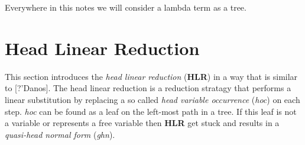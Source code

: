 \documentclass[a4paper, 10pt]{article}
\begin{document}
Everywhere in this notes we will consider a lambda term as a tree.

\section{Head Linear Reduction}

This section introduces the \emph{head linear reduction} (\textbf{HLR}) in a way that
is similar to [?'Danos].
The head linear reduction is a reduction stratagy that performs a linear substitution
by replacing a so called \emph{head variable occurrence} (\emph{hoc}) on each step.
\emph{hoc} can be found as a leaf on the left-most path in a tree. If this leaf is not
a variable or represents a free variable then \textbf{HLR} get stuck and results in a
\emph{quasi-head normal form} (\emph{ghn}).
\end{document}
